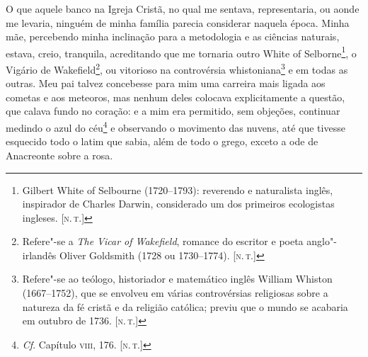 O que aquele banco na Igreja Cristã, no qual me sentava, representaria,
ou aonde me levaria, ninguém de minha família parecia considerar naquela
época. Minha mãe, percebendo minha inclinação para a metodologia e as
ciências naturais, estava, creio, tranquila, acreditando que me tornaria
outro White of Selborne\footnote{Gilbert White of Selbourne (1720--1793):
  reverendo e naturalista inglês, inspirador de Charles Darwin,
  considerado um dos primeiros ecologistas ingleses. {[}\textsc{n.\,t.}{]}}, o
Vigário de Wakefield\footnote{Refere"-se a \emph{The Vicar of Wakefield},
  romance do escritor e poeta anglo"-irlandês Oliver Goldsmith (1728 ou
  1730--1774). {[}\textsc{n.\,t.}{]}}, ou vitorioso na controvérsia
whistoniana\footnote{Refere"-se ao teólogo, historiador e matemático
  inglês William Whiston (1667--1752), que se envolveu em várias
  controvérsias religiosas sobre a natureza da fé cristã e da religião
  católica; previu que o mundo se acabaria em outubro de 1736. {[}\textsc{n.\,t.}{]}} e em todas as outras. Meu pai talvez concebesse para mim uma
carreira mais ligada aos cometas e aos meteoros, mas nenhum deles
colocava explicitamente a questão, que calava fundo no coração: e a mim
era permitido, sem objeções, continuar medindo o azul do céu\footnote{\emph{Cf}.
  Capítulo \textsc{viii}, 176. {[}\textsc{n.\,t.}{]}} e observando o movimento das
nuvens, até que tivesse esquecido todo o latim que sabia, além de todo o
grego, exceto a ode de Anacreonte sobre a rosa.

